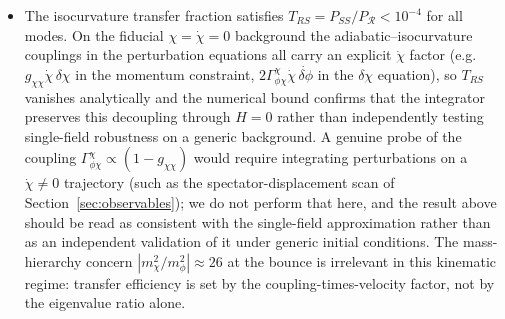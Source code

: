 \documentclass[11pt,a4paper]{article}
\begin{document}
\begin{itemize}
\textit{(b) Hamiltonian constraint (independent check):} The perturbed $(0,0)$ Einstein equation $3H(\dot\Phi + H\Phi) + k^2\Phi/a^2 = -\delta\rho/(2M_{\rm Pl}^2)$ is \emph{not} used in the evolution; it provides a genuinely independent consistency check. We evaluate the Hamiltonian constraint residual $\mathcal{H}_k(t) \equiv |{\rm LHS} - {\rm RHS}|/\max(|{\rm LHS}|, |{\rm RHS}|)$ from the numerical solution. For modes with $k \leq 5\,k_H$ in the super-Hubble regime, the worst median residual is $\sim\!\HCmedian\%$---orders of magnitude smaller than the momentum constraint metric, because the HC is an algebraic (not finite-differenced) check. This confirms that the full Einstein system is satisfied to high accuracy and that the initial data are constraint-consistent.
\item The isocurvature transfer fraction satisfies $T_{RS} = P_{SS}/P_\mathcal{R} < 10^{-4}$ for all modes. On the fiducial $\chi = \dot\chi = 0$ background the adiabatic--isocurvature couplings in the perturbation equations all carry an explicit $\dot\chi$ factor (e.g.\ $g_{\chi\chi}\dot\chi\,\delta\chi$ in the momentum constraint, $2\Gamma^\chi_{\phi\chi}\dot\chi\,\dot{\delta\phi}$ in the $\delta\chi$ equation), so $T_{RS}$ vanishes analytically and the numerical bound confirms that the integrator preserves this decoupling through $H = 0$ rather than independently testing single-field robustness on a generic background. A genuine probe of the coupling $\Gamma^\chi_{\phi\chi} \propto (1 - g_{\chi\chi})$ would require integrating perturbations on a $\dot\chi \neq 0$ trajectory (such as the spectator-displacement scan of Section~\ref{sec:observables}); we do not perform that here, and the result above should be read as consistent with the single-field approximation rather than as an independent validation of it under generic initial conditions. The mass-hierarchy concern $|m_\chi^2/m_\phi^2| \approx 26$ at the bounce is irrelevant in this kinematic regime: transfer efficiency is set by the coupling-times-velocity factor, not by the eigenvalue ratio alone.

\end{itemize}
\end{document}
